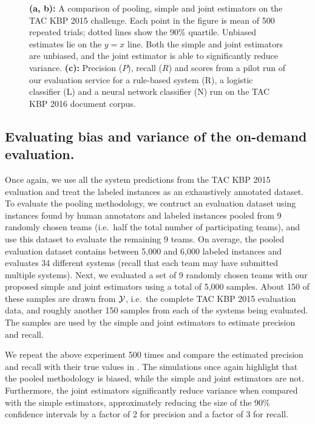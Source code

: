 \begin{figure}[t]
  \caption{\label{fig:simulation}
  \textbf{(a, b):}
  A comparison of pooling, simple and joint estimators on the TAC KBP 2015 challenge.
  Each point in the figure is mean of 500 repeated trials; dotted lines show the 90\% quartile.
  Unbiased estimates lie on the $y = x$ line.
  Both the simple and joint estimators are unbiased, and the joint estimator is able to significantly reduce variance.
  \textbf{(c):} 
Precision ($P$), recall ($R$) and \fone{} scores from a pilot run of our evaluation service for a rule-based system (R), a logistic classifier (L) and a neural network classifier (N) run on the TAC KBP 2016 document corpus. 
  }


\end{figure}

\subsection{Evaluating bias and variance of the on-demand evaluation.}
Once again, we use all the system predictions from the TAC KBP 2015 evaluation and treat the labeled instances as an exhaustively annotated dataset.
To evaluate the pooling methodology, we contruct an evaluation dataset using
instances found by human annotators and labeled instances pooled from 9
randomly chosen teams (i.e.\ half the total number of participating teams), and
use this dataset to evaluate the remaining 9 teams.
On average, the pooled evaluation dataset contains between 5,000 and 6,000 labeled instances and evaluates 34 different systems (recall that each team may have submitted multiple systems).
Next, we evaluated a set of 9 randomly chosen teams with our proposed simple and joint estimators using a total of 5,000 samples.
About 150 of these samples are drawn from $\mathcal{Y}$, i.e.\ the complete TAC KBP 2015 evaluation data, and roughly another 150 samples from each of the systems being evaluated.
The samples are used by the simple and joint estimators to estimate precision and recall.

We repeat the above experiment 500 times and compare the estimated precision and recall with their true values in .
The simulations once again highlight that the pooled methodology is biased, while the simple and joint estimators are not.
Furthermore, the joint estimators significantly reduce variance when compared with the simple estimators,
approximately reducing the size of the 90\% confidence intervals by a factor of 2 for precision and a factor of 3 for recall.

